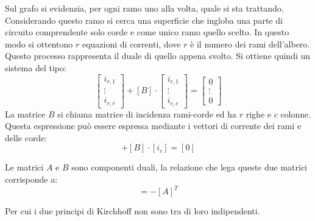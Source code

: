 \documentclass{article}
\numberwithin{equation}{subsection}
\begin{document}
Sul grafo si evidenzia, per ogni ramo uno alla volta, quale si sta trattando. Considerando questo ramo si cerca una superficie che ingloba una parte di circuito comprendente 
solo corde e come unico ramo quello scelto. In questo modo si ottentono $r$ equazioni di correnti, dove $r$ è il numero dei rami dell'albero. Questo processo rappresenta il duale 
di quello appena svolto. Si ottiene quindi un sistema del tipo:
\begin{equation*}
    \begin{bmatrix}
        i_{r,1}\\
        \vdots\\
        i_{r,r}
    \end{bmatrix}+[B]\cdot\begin{bmatrix}
        i_{c,1}\\
        \vdots\\
        i_{c,c}
    \end{bmatrix}=\begin{bmatrix}
        0\\
        \vdots\\
        0
    \end{bmatrix}
\end{equation*}
La matrice $B$ si chiama matrice di incidenza rami-corde ed ha $r$ righe e $c$ colonne. Questa espressione può essere espressa mediante i vettori di corrente dei rami e delle 
corde:
\begin{equation*}
    [i_{r}]+[B]\cdot [i_{c}]=[0]
\end{equation*}

Le matrici $A$ e $B$ sono componenti duali, la relazione che lega queste due matrici corrisponde a:
\begin{equation*}
    [B]=-[A]^T
\end{equation*}

Per cui i due principi di Kirchhoff non sono tra di loro indipendenti. 
\end{document}
